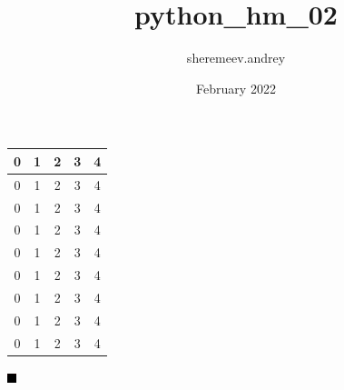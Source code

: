 \documentclass{article}
\title{python_hm_02}
\author{sheremeev.andrey}
\date{February 2022}
\begin{document}
\begin{tabular} { | c | c | c | c | c | }
  \hline
0 & 1 & 2 & 3 & 4 \\ \hline
0 & 1 & 2 & 3 & 4 \\ \hline
0 & 1 & 2 & 3 & 4 \\ \hline
0 & 1 & 2 & 3 & 4 \\ \hline
0 & 1 & 2 & 3 & 4 \\ \hline
0 & 1 & 2 & 3 & 4 \\ \hline
0 & 1 & 2 & 3 & 4 \\ \hline
0 & 1 & 2 & 3 & 4 \\ \hline
0 & 1 & 2 & 3 & 4 \\ 
  \hline
\end{tabular}

\includegraphics[scale=0.2]{ast}
\end{document}

